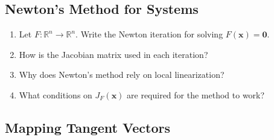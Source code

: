 \subsection{Newton's Method for Systems}
\begin{enumerate}[resume]
  \item Let $F : \mathbb{R}^n \to \mathbb{R}^n$. Write the Newton iteration for solving $F(\mathbf{x}) = \mathbf{0}$.
  \item How is the Jacobian matrix used in each iteration?
  \item Why does Newton's method rely on local linearization?
  \item What conditions on $J_F(\mathbf{x})$ are required for the method to work?
\end{enumerate}

\subsection{Mapping Tangent Vectors}
